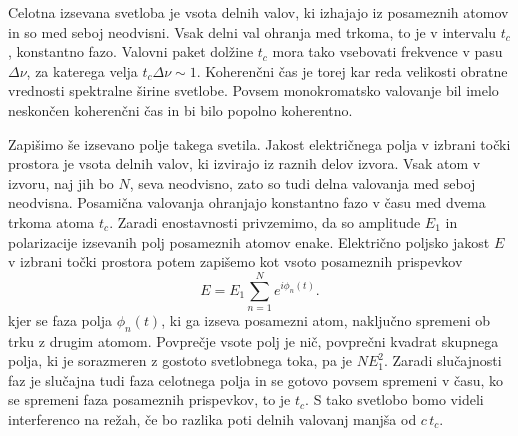 Celotna izsevana svetloba je vsota delnih valov, ki izhajajo iz posameznih
atomov in so med seboj neodvisni. Vsak delni val ohranja med trkoma,
to je v intervalu $t_{c}$, konstantno fazo. Valovni paket dolžine 
$t_{c}$ mora tako vsebovati frekvence v pasu $\Delta \nu$,
za katerega velja $t_{c}\Delta\nu\sim1$. Koherenčni čas je torej
kar reda velikosti obratne vrednosti spektralne širine svetlobe. Povsem
monokromatsko valovanje bil imelo neskončen koherenčni čas in bi bilo
popolno koherentno.

Zapišimo še izsevano polje takega svetila. 
Jakost električnega polja v izbrani točki prostora je vsota delnih
valov, ki izvirajo iz raznih delov izvora. Vsak atom v izvoru, naj
jih bo $N$, seva neodvisno, zato so tudi delna valovanja med seboj
neodvisna. Posamična valovanja ohranjajo konstantno fazo v času med
dvema trkoma atoma $t_{c}$. Zaradi enostavnosti privzemimo,
da so amplitude $E_{1}$ in polarizacije izsevanih polj posameznih atomov enake. 
Električno poljsko jakost $E$ v izbrani točki prostora potem 
zapišemo kot vsoto posameznih prispevkov
\begin{equation}
E=E_{1}\sum_{n=1}^{N}e^{i\phi_{n}(t)}.
\label{eq:amplituda-random}
\end{equation}
kjer se faza polja $\phi_{n}(t)$, ki ga izseva posamezni atom, naključno
spremeni ob trku z drugim atomom. Povprečje vsote polj je nič, 
povprečni kvadrat skupnega polja, ki je sorazmeren
z gostoto svetlobnega toka, pa je $NE_{1}^{2}$. Zaradi slučajnosti faz je 
slučajna tudi faza celotnega polja in se gotovo povsem spremeni v času, ko se
spremeni faza posameznih prispevkov, to je $t_{c}$. S tako svetlobo bomo videli 
interferenco na režah, če bo razlika poti delnih valovanj manjša od $c\, t_{c}$.

